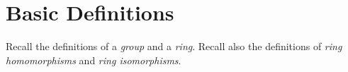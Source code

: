 \section{Basic Definitions}

Recall the definitions of a {\em group} and a {\em ring}. Recall also the
definitions of {\em ring homomorphisms} and {\em ring isomorphisms}.
